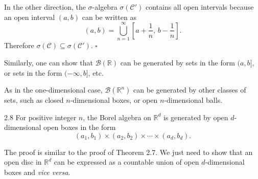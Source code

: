 In the other direction, the $\sigma$-algebra $\sigma(\mathcal{C}')$ contains all open intervals because an open interval $(a,b)$ can be written as
\[
(a,b)=\bigcup_{n=1}^{\infty} \left[a+\frac{1}{n},\, b-\frac{1}{n}\right].
\]
Therefore $\sigma(\mathcal{C})\subseteq \sigma(\mathcal{C}')$. \hfill $\square$

Similarly, one can show that $\mathcal{B}(\mathbb{R})$ can be generated by sets in the form $(a,b]$, or sets in the form $(-\infty,b]$, etc.

As in the one-dimensional case, $\mathcal{B}(\mathbb{R}^n)$ can be generated by other classes of sets, such as closed $n$-dimensional boxes, or open $n$-dimensional balls.

\begin{thmbox}{2.8}
For positive integer $n$, the Borel algebra on $\mathbb{R}^d$ is generated by open $d$-dimensional open boxes in the form
\[
(a_1,b_1)\times (a_2,b_2)\times \cdots \times (a_d,b_d).
\]
\end{thmbox}

The proof is similar to the proof of Theorem 2.7. We just need to show that an open disc in $\mathbb{R}^d$ can be expressed as a countable union of open $d$-dimensional boxes and \textit{vice versa}.
